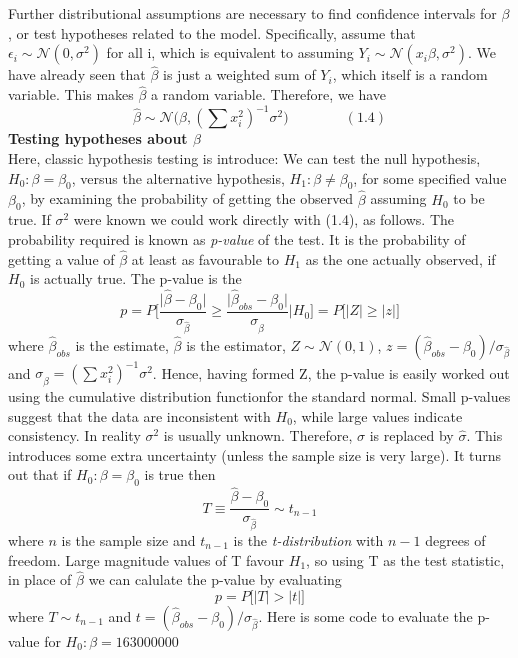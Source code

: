 \documentclass[
]{article}
\begin{document}
Further distributional assumptions are necessary to find confidence
intervals for \(\beta\), or test hypotheses related to the model.
Specifically, assume that \(\epsilon_i \sim \mathcal{N}(0, \sigma^2)\)
for all i, which is equivalent to assuming
\(Y_i \sim \mathcal{N}(x_i\beta, \sigma^2)\). We have already seen that
\(\hat \beta\) is just a weighted sum of \(Y_i\), which itself is a
random variable. This makes \(\hat \beta\) a random variable. Therefore,
we have \[
  \hat \beta \sim \mathcal{N}\big( \beta, (\sum x_i^2)^{-1} \sigma^2\big)  \qquad \qquad (1.4)
\] \textbf{Testing hypotheses about \(\beta\)}\\
Here, classic hypothesis testing is introduce: We can test the null
hypothesis, \(H_0 : \beta = \beta_0\), versus the alternative
hypothesis, \(H_1 : \beta \neq \beta_0\), for some specified value
\(\beta_0\), by examining the probability of getting the observed
\(\hat \beta\) assuming \(H_0\) to be true. If \(\sigma^2\) were known
we could work directly with (1.4), as follows. The probability required
is known as \emph{p-value} of the test. It is the probability of getting
a value of \(\hat \beta\) at least as favourable to \(H_1\) as the one
actually observed, if \(H_0\) is actually true. The p-value is the \[
  p = P\Big[ \frac{\vert \hat \beta - \beta_0 \vert}{\sigma_{\hat \beta}} \ge \frac{\vert \hat \beta_{obs} - \beta_0 \vert}{\sigma_{\hat \beta}}\Big \vert H_0 \Big] = P\Big[ \vert Z \vert \ge \vert z \vert \Big]
\] where \(\hat \beta_{obs}\) is the estimate, \(\hat \beta\) is the
estimator, \(Z \sim \mathcal N(0,1)\),
\(z = (\hat \beta_{obs} - \beta_0)/\sigma_{\hat \beta}\) and
\(\sigma_{\hat \beta} = (\sum x_i^2)^{-1} \sigma^2\). Hence, having
formed Z, the p-value is easily worked out using the cumulative
distribution functionfor the standard normal. Small p-values suggest
that the data are inconsistent with \(H_0\), while large values indicate
consistency. In reality \(\sigma^2\) is usually unknown. Therefore,
\(\sigma\) is replaced by \(\hat \sigma\). This introduces some extra
uncertainty (unless the sample size is very large). It turns out that if
\(H_0 : \beta = \beta_0\) is true then \[
  T \equiv \frac{\hat \beta - \beta_0}{\sigma_{\hat \beta}} \sim t_{n-1}
\] where \(n\) is the sample size and \(t_{n-1}\) is the
\emph{t-distribution} with \(n-1\) degrees of freedom. Large magnitude
values of T favour \(H_1\), so using T as the test statistic, in place
of \(\hat \beta\) we can calulate the p-value by evaluating \[
  p = P\Big[\vert T \vert > \vert t \vert \Big]
\] where \(T \sim t_{n-1}\) and
\(t = (\hat \beta_{obs} - \beta_0)/ \sigma_{\hat \beta}\). Here is some
code to evaluate the p-value for \(H_0 : \beta = 163000000\)
\end{document}
